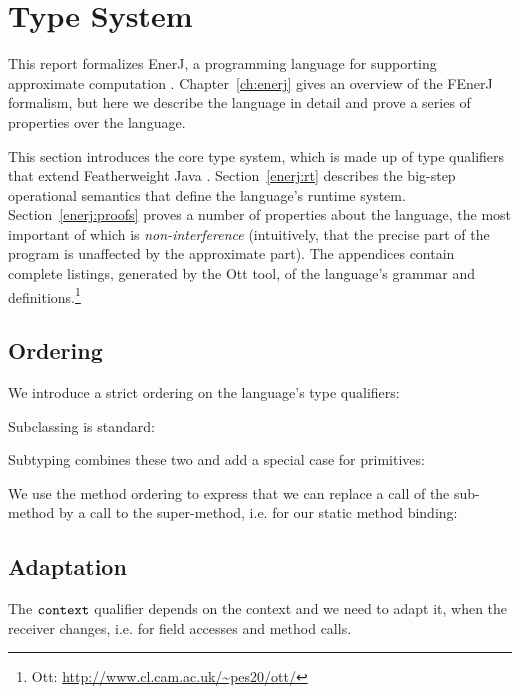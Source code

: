 \section{Type System}
\label{enerj:typesystem}

This report formalizes EnerJ, a programming language for supporting approximate
computation \cite{enerj}. Chapter~\ref{ch:enerj} gives an overview of the
FEnerJ formalism, but here we describe the language in detail and prove a series
of properties over the language.

This section introduces the core type system, which is made up of type
qualifiers that extend Featherweight Java \cite{fjava}. Section~\ref{enerj:rt}
describes the big-step operational semantics that define the language's runtime
system. Section~\ref{enerj:proofs} proves a number of properties about the language,
the most important of which is \emph{non-interference} (intuitively, that the
precise part of the program is unaffected by the approximate part). The
appendices contain complete listings, generated by the Ott tool,
of the language's grammar and
definitions.\footnote{Ott: \url{http://www.cl.cam.ac.uk/~pes20/ott/}}


\subsection{Ordering}

We introduce a strict ordering on the language's type qualifiers:

\ottdefnqorder


Subclassing is standard:

\ottdefnsubclassing


Subtyping combines these two and add a special case for primitives:

\ottdefnsubtyping


We use the method ordering to express that we can replace a call of
the sub-method by a call to the super-method, i.e. for our static
method binding:

\ottdefnmethodsubtyping


\subsection{Adaptation}

The $ \texttt{\upshape{context}\,\!} $ qualifier depends on the context and we need to
adapt it, when the receiver changes, i.e. for field accesses and
method calls.

